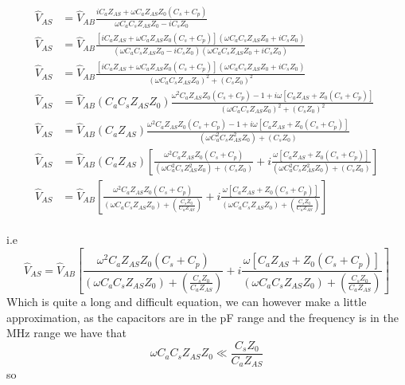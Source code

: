 \begin{eqnarray}
\hat{V}_{AS} &= \hat{V}_{AB}\frac{i C_a Z_{AS} + \omega C_a Z_{AS} Z_0(C_s + C_p)}{\omega C_a C_s Z_{AS} Z_0 - iC_s Z_0}\\
\hat{V}_{AS} &= \hat{V}_{AB}\frac{\left[i C_a Z_{AS} + \omega C_a Z_{AS} Z_0(C_s + C_p)\right](\omega C_a C_s Z_{AS} Z_0 + iC_s Z_0)}{(\omega C_a C_s Z_{AS} Z_0 - iC_s Z_0)(\omega C_a C_s Z_{AS} Z_0 + iC_s Z_0)}\\
\hat{V}_{AS} &= \hat{V}_{AB}\frac{\left[i C_a Z_{AS} + \omega C_a Z_{AS} Z_0(C_s + C_p)\right](\omega C_a C_s Z_{AS} Z_0 + iC_s Z_0)}{(\omega C_a C_s Z_{AS} Z_0)^2 + (C_s Z_0)^2}\\
\hat{V}_{AS} &= \hat{V}_{AB}(C_a C_s Z_{AS} Z_0)\frac{\omega^2 C_a Z_{AS} Z_0(C_s + C_p) - 1 + i\omega  \left[C_a Z_{AS} + Z_0(C_s + C_p)\right]}{(\omega C_a C_s Z_{AS} Z_0)^2 + (C_s Z_0)^2}\\
\hat{V}_{AS} &= \hat{V}_{AB}(C_a Z_{AS} )\frac{\omega^2 C_a Z_{AS} Z_0(C_s + C_p) - 1 + i\omega  \left[C_a Z_{AS} + Z_0(C_s + C_p)\right]}{(\omega C_a^2 C_s Z_{AS}^2 Z_0) + (C_s Z_0)}\\
\hat{V}_{AS} &= \hat{V}_{AB}(C_a Z_{AS})\left[\frac{\omega^2 C_a Z_{AS} Z_0(C_s + C_p)}{(\omega C_a^2 C_s Z_{AS}^2 Z_0) + (C_s Z_0)} + i\frac{\omega  \left[C_a Z_{AS} + Z_0(C_s + C_p)\right]}{(\omega C_a^2 C_s Z_{AS}^2 Z_0) + (C_s Z_0)}\right]\\
\hat{V}_{AS} &= \hat{V}_{AB}\left[\frac{\omega^2 C_a Z_{AS} Z_0(C_s + C_p)}{(\omega C_a C_s Z_{AS} Z_0) + (\frac{C_s Z_0}{C_a Z_{AS}})} + i\frac{\omega  \left[C_a Z_{AS} + Z_0(C_s + C_p)\right]}{(\omega C_a C_s Z_{AS} Z_0) + (\frac{C_s Z_0}{C_a Z_{AS}})}\right]
\end{eqnarray}\\
i.e
\begin{equation}
	\boxed{
	\hat{V}_{AS} = \hat{V}_{AB}\left[\frac{\omega^2 C_a Z_{AS} Z_0(C_s + C_p)}{(\omega C_a C_s Z_{AS} Z_0) + (\frac{C_s Z_0}{C_a Z_{AS}})} + i\frac{\omega  \left[C_a Z_{AS} + Z_0(C_s + C_p)\right]}{(\omega C_a C_s Z_{AS} Z_0) + (\frac{C_s Z_0}{C_a Z_{AS}})}\right]}
\end{equation}
Which is quite a long and difficult equation, we can however make a little approximation, as the capacitors are in the pF range and the frequency is in the MHz range
we have that
\begin{equation}
	\omega C_a C_s Z_{AS} Z_0 \ll \frac{C_s Z_0}{C_a Z_{AS}}
\end{equation}
so
